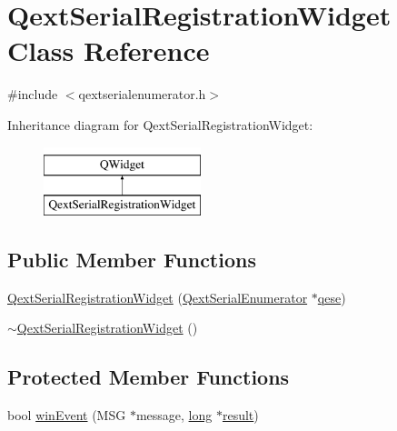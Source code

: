 \hypertarget{class_qext_serial_registration_widget}{\section{Qext\-Serial\-Registration\-Widget Class Reference}
\label{class_qext_serial_registration_widget}
}


{\ttfamily \#include $<$qextserialenumerator.\-h$>$}

Inheritance diagram for Qext\-Serial\-Registration\-Widget\-:\begin{figure}[H]
\begin{center}
\leavevmode
\includegraphics[height=2.000000cm]{class_qext_serial_registration_widget}
\end{center}
\end{figure}
\subsection*{Public Member Functions}
\begin{DoxyCompactItemize}
\item 
\hyperlink{class_qext_serial_registration_widget_a54a323194db42c4c4213746d4b5aa6d3}{Qext\-Serial\-Registration\-Widget} (\hyperlink{class_qext_serial_enumerator}{Qext\-Serial\-Enumerator} $\ast$\hyperlink{class_qext_serial_registration_widget_ac617d06aed20e704e6b1c0b039f999d0}{qese})
\item 
\hyperlink{class_qext_serial_registration_widget_a6c6377d15df80b29a0cb73f63f859738}{$\sim$\-Qext\-Serial\-Registration\-Widget} ()
\end{DoxyCompactItemize}
\subsection*{Protected Member Functions}
\begin{DoxyCompactItemize}
\item 
bool \hyperlink{class_qext_serial_registration_widget_a344993ce5350f6ef7b043ad4f63877d4}{win\-Event} (M\-S\-G $\ast$message, \hyperlink{ioapi_8h_a3c7b35ad9dab18b8310343c201f7b27e}{long} $\ast$\hyperlink{qxtslotjob_8h_aab161efab0511ea9612b64c40e9852ca}{result})
\end{DoxyCompactItemize}
